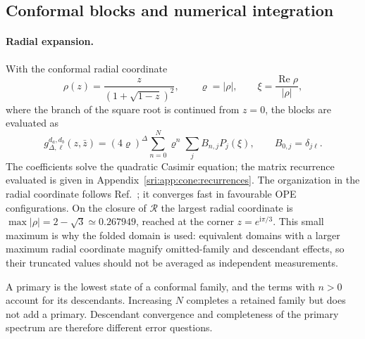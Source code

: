 \subsection{Conformal blocks and numerical integration}\label{sri:app:cone:blocks}
\paragraph{Radial expansion.} With the conformal radial coordinate
\begin{equation}
 \rho(z)=\frac{z}{(1+\sqrt{1-z})^2},\qquad \varrho=|\rho|,\qquad \xi=\frac{\operatorname{Re}\rho}{|\rho|},
\end{equation}
where the branch of the square root is continued from $z=0$, the blocks are evaluated as
\begin{equation}
 g_{\Delta,\ell}^{d_a,d_b}(z,\bar z)=(4\varrho)^\Delta\sum_{n=0}^{N}\varrho^n\sum_jB_{n,j}P_j(\xi),\qquad
 B_{0,j}=\delta_{j\ell}.
 \label{sri:eq:cone:rhoblock}
\end{equation}
The coefficients solve the quadratic Casimir equation; the matrix recurrence evaluated is given in
Appendix~\ref{sri:app:cone:recurrences}. The organization in the radial coordinate follows Ref.~\cite{sri:Hogervorst:2013}; it
converges fast in favourable OPE configurations. On the closure of $\mathcal R$ the largest radial coordinate is
$\max|\rho|=2-\sqrt3\simeq0.267949$, reached at the corner $z=e^{\mathrm i\pi/3}$. This small maximum is why the folded domain
is used: equivalent domains with a larger maximum radial coordinate magnify omitted-family and descendant effects, so
their truncated values should not be averaged as independent measurements.

A primary is the lowest state of a conformal family, and the terms with $n>0$ account for its descendants. Increasing
$N$ completes a retained family but does not add a primary. Descendant convergence and completeness of the primary
spectrum are therefore different error questions.

